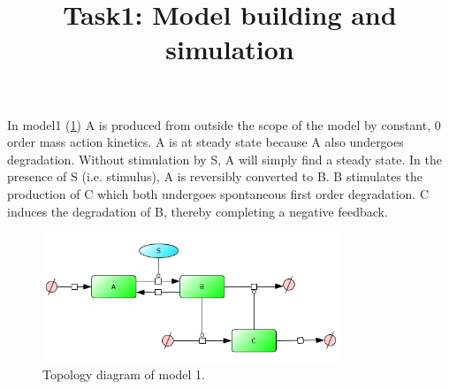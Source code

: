 \documentclass[11pt]{article}
\title{Task1: Model building and simulation}
\begin{document}
    \maketitle

    In model1 (\cref{fig:model1:network}) A is produced from outside the scope of the model by constant, 0 order mass action kinetics. A is at steady state because
    A also undergoes degradation. Without stimulation by S, A will simply find a steady state. In
    the presence of S (i.e. stimulus), A is reversibly converted to B. B stimulates the production of C which both undergoes
    spontaneous first order degradation. C induces the degradation of B, thereby completing a negative feedback.

    \begin{figure}[h]

    \end{figure}


    \begin{figure}[b]
            \centering
            \includegraphics[width=0.8\textwidth]{../figures/model1.png}
            \caption{Topology diagram of model 1.}
            \label{fig:model1:network}
    \end{figure}
\end{document}
